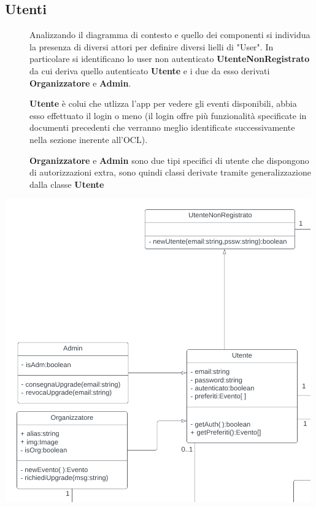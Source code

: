 \documentclass{article}
\begin{document}
\subsection{Utenti}
\begin{description}
    \item[] Analizzando il diagramma di contesto e quello dei componenti si individua la presenza di diversi attori per definire diversi lielli di "User". In particolare si identificano lo user non autenticato \textbf{UtenteNonRegistrato} da cui deriva quello autenticato \textbf{Utente} e i due da esso derivati \textbf{Organizzatore} e \textbf{Admin}.
    \item[] \textbf{Utente} è colui che utlizza l'app per vedere gli eventi disponibili, abbia esso effettuato il login o meno (il login offre più funzionalità specificate in documenti precedenti che verranno meglio identificate successivamente nella sezione inerente all'OCL).
    \item[] \textbf{Organizzatore} e \textbf{Admin} sono due tipi specifici di utente che dispongono di autorizzazioni extra, sono quindi classi derivate tramite generalizzazione dalla classe \textbf{Utente}
\end{description}
\begin{center}
    \item[] \includegraphics[scale=0.7]{utenti.png}
\end{center}
\newpage
\end{document}
